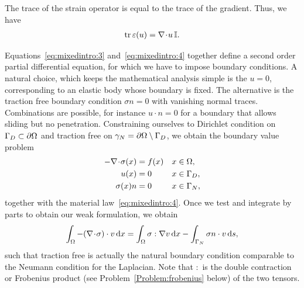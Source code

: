 \begin{remark}
  The trace of the strain operator is equal to the trace of the
  gradient. Thus, we have
  \begin{gather}
    \label{eq:mixedintro:5}
    \operatorname{tr} \varepsilon(u) = \nabla\!\cdot\! u \,\mathbb I.
  \end{gather}
\end{remark}

\begin{intro}
  Equations~\eqref{eq:mixedintro:3} and~\eqref{eq:mixedintro:4}
  together define a second order partial differential equation, for
  which we have to impose boundary conditions. A natural choice, which
  keeps the mathematical analysis simple is the  $u=0$, corresponding to an elastic body whose
  boundary is fixed. The alternative is the traction free boundary
  condition $\sigma n=0$ with vanishing normal traces. Combinations
  are possible, for instance $u\cdot n=0$ for a boundary that allows
  sliding but no penetration. Constraining ourselves to Dirichlet
  condition on $\Gamma_D\subset \partial\Omega$ and traction free on
  $\gamma_N = \partial\Omega\setminus\Gamma_D$, we obtain the
  boundary value problem
  \begin{gather}
    \label{eq:mixedintro:lame-navier-bvp}
    \begin{aligned}
      -\nabla\!\cdot\! \sigma(x) &= f(x) & x&\in\Omega,\\
      u(x) &= 0 & x&\in\Gamma_D, \\
      \sigma(x)n &=0& x&\in\Gamma_N,
    \end{aligned}
  \end{gather}
  together with the material law~\eqref{eq:mixedintro:4}.  Once we
  test and integrate by parts to obtain our weak formulation, we
  obtain
  \begin{gather*}
    \int_{\Omega} -(\nabla\!\cdot\! \sigma) \cdot v\,\mathrm{d} x
    = \int_{\Omega} \sigma : \nabla v\,\mathrm{d} x
    - \int_{\Gamma_N} \sigma n\cdot v\,\mathrm{d} s,
  \end{gather*}
  such that traction free is actually the natural boundary condition
  comparable to the Neumann condition for the Laplacian. Note that $:$
  is the double contraction or Frobenius product (see
  Problem~\ref{Problem:frobenius} below) of the two tensors.
\end{intro}

